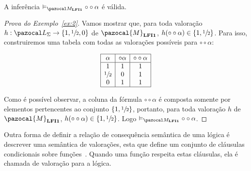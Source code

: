         \begin{exemplo}\label{ex:2}
            A inferência $ \conmat \circ \circ \alpha$ é válida.
        \end{exemplo}

        \begin{proof}[Prova do Exemplo~\ref{ex:2}]
            Vamos mostrar que, para toda valoração $h : \ling{} \to \{1,\meio{},0\}$ de $\pazocal{M}_{\lfium{}}$, $h(\circ \circ \alpha) \in \{1, \sfrac{1}{2}{}\}$. Para isso, construiremos uma tabela com todas as valorações possíveis para $\circ \circ \alpha$:
            \begin{center}
                \[
                    \begin{array}{|c|c|c|}%
                        \hline%
                        \alpha      & \circ \alpha & \circ \circ \alpha   \\
                        \hline%
                        1           & 1            &    1\\
                        \meio{    } & 0            &    1\\
                        0           & 1            &    1\\
                        \hline%
                    \end{array}
                \]
            \end{center}

            Como é possível observar, a coluna da fórmula $\circ \circ \alpha$ é composta somente por elementos pertencentes ao conjunto $\{1, \sfrac{1}{2}{}\}$, portanto, para toda valoração $h$ de $\pazocal{M}_{\lfium{}}$, $h(\circ \circ \alpha) \in \{1, \sfrac{1}{2}{}\}$. Logo $ \conmat \circ \circ \alpha$.
            
        \end{proof}

        
        Outra forma de definir a relação de consequência semântica de uma lógica é descrever uma semântica de valorações, esta que define um conjunto de cláusulas condicionais sobre funções~\cite{DaCosta1977-NEWASA-3}. Quando uma função respeita estas cláusulas, ela é chamada de valoração para a lógica.

